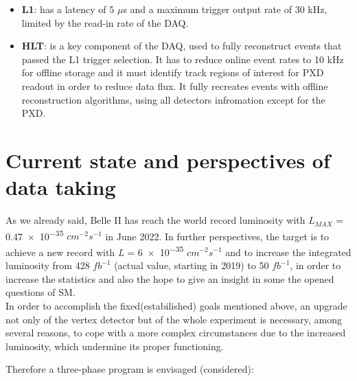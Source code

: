 \begin{itemize}
\item \textbf{L1}: has a latency of 5 $\mu$s and a maximum trigger output rate of 30 kHz, limited by the read-in rate of the DAQ.
\item \textbf{HLT}: is a key component of the DAQ, used to fully reconstruct events that passed the L1 trigger selection. It has to reduce online event rates to 10 kHz for offline storage and it must identify track regions of interest for PXD readout in order to reduce data flux. It fully recreates events with offline reconstruction algorithms, using all detectors infromation except for the PXD.
\end{itemize}


\begin{comment}
\begin{figure}
\centering
\texttt{[image: detector\_summary]}
\caption{}
\label{}
\end{figure}
\end{comment}


\section{Current state and perspectives of data taking}

As we already said, Belle II has reach the world record luminosity with $\textit{L}_{MAX}$ = \num{0.47e-35} $cm^{-2}s^{-1}$ in June 2022. In further perspectives, the target is to achieve a new record with \textit{L} = \num{6e-35} $cm^{-2}s^{-1}$ and to increase the integrated luminosity from 428 $fb^{-1}$ (actual value, starting in 2019) to 50 $fb^{-1}$, in order to increase the statistics and also the hope to give an insight in some the opened questions of SM.\\

In order to accomplish the fixed(estabilished) goals mentioned above, an upgrade not only of the vertex detector but of the whole experiment is necessary, among several reasons, to cope with a more complex circumstances due to the increased luminosity, which undermine its proper functioning.

Therefore a three-phase program is envisaged (considered):

